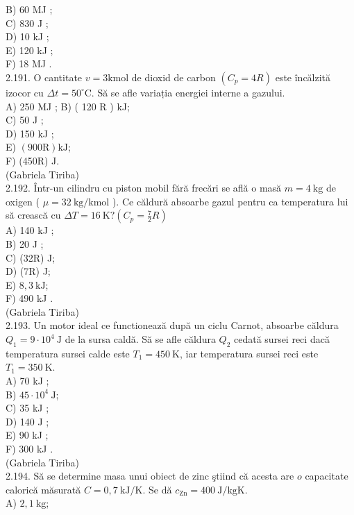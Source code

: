 \documentclass[10pt]{article}
\begin{document}
B) 60 MJ ;\\
C) 830 J ;\\
D) 10 kJ ;\\
E) 120 kJ ;\\
F) 18 MJ .\\
2.191. O cantitate $v=3 \mathrm{kmol}$ de dioxid de carbon $\left(C_{p}=4 R\right)$ este încălzită izocor cu $\Delta t=50^{\circ} \mathrm{C}$. Să se afle variația energiei interne a gazului.\\
A) 250 MJ ; B) ( 120 R ) kJ;\\
C) 50 J ;\\
D) 150 kJ ;\\
E) $(900 \mathrm{R}) \mathrm{kJ}$;\\
F) (450R) J.\\
(Gabriela Tiriba)\\
2.192. Într-un cilindru cu piston mobil fără frecări se află o masă $m=4 \mathrm{~kg}$ de oxigen ( $\mu=32 \mathrm{~kg} / \mathrm{kmol}$ ). Ce căldură absoarbe gazul pentru ca temperatura lui să crească cu $\Delta T=16 \mathrm{~K} ?\left(C_{p}=\frac{7}{2} R\right)$\\
A) 140 kJ ;\\
B) 20 J ;\\
C) (32R) J;\\
D) (7R) J;\\
E) $8,3 \mathrm{~kJ}$;\\
F) 490 kJ .\\
(Gabriela Tiriba)\\
2.193. Un motor ideal ce functionează după un ciclu Carnot, absoarbe căldura $Q_{1}=9 \cdot 10^{4} \mathrm{~J}$ de la sursa caldă. Să se afle căldura $Q_{2}$ cedată sursei reci dacă temperatura sursei calde este $T_{1}=450 \mathrm{~K}$, iar temperatura sursei reci este $T_{1}=350 \mathrm{~K}$.\\
A) 70 kJ ;\\
B) $45 \cdot 10^{4} \mathrm{~J}$;\\
C) 35 kJ ;\\
D) 140 J ;\\
E) 90 kJ ;\\
F) 300 kJ .\\
(Gabriela Tiriba)\\
2.194. Să se determine masa unui obiect de zinc ştiind că acesta are $o$ capacitate calorică măsurată $C=0,7 \mathrm{~kJ} / \mathrm{K}$. Se dă $c_{\mathrm{Zn}}=400 \mathrm{~J} / \mathrm{kgK}$.\\
A) $2,1 \mathrm{~kg}$;\\
\end{document}
